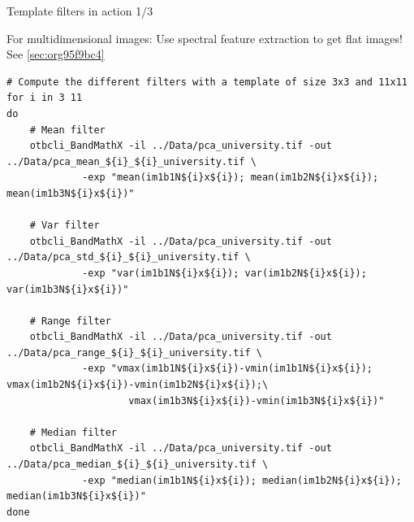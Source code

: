 \documentclass[10pt,aspectratio=1610]{beamer}
\begin{document}
\begin{frame}[fragile,label={sec:org5862523}]{Template filters in action 1/3}
 \begin{center}
\alert{For multidimensional images: Use spectral feature extraction to get flat images!} See \ref{sec:org95f9bc4}
\end{center}

\begin{verbatim}
# Compute the different filters with a template of size 3x3 and 11x11
for i in 3 11
do
    # Mean filter
    otbcli_BandMathX -il ../Data/pca_university.tif -out ../Data/pca_mean_${i}_${i}_university.tif \
		     -exp "mean(im1b1N${i}x${i}); mean(im1b2N${i}x${i}); mean(im1b3N${i}x${i})"

    # Var filter
    otbcli_BandMathX -il ../Data/pca_university.tif -out ../Data/pca_std_${i}_${i}_university.tif \
		     -exp "var(im1b1N${i}x${i}); var(im1b2N${i}x${i}); var(im1b3N${i}x${i})"

    # Range filter
    otbcli_BandMathX -il ../Data/pca_university.tif -out ../Data/pca_range_${i}_${i}_university.tif \
		     -exp "vmax(im1b1N${i}x${i})-vmin(im1b1N${i}x${i}); vmax(im1b2N${i}x${i})-vmin(im1b2N${i}x${i});\
                     vmax(im1b3N${i}x${i})-vmin(im1b3N${i}x${i})"

    # Median filter
    otbcli_BandMathX -il ../Data/pca_university.tif -out ../Data/pca_median_${i}_${i}_university.tif \
		     -exp "median(im1b1N${i}x${i}); median(im1b2N${i}x${i}); median(im1b3N${i}x${i})"
done
\end{verbatim}
\end{frame}
\end{document}
